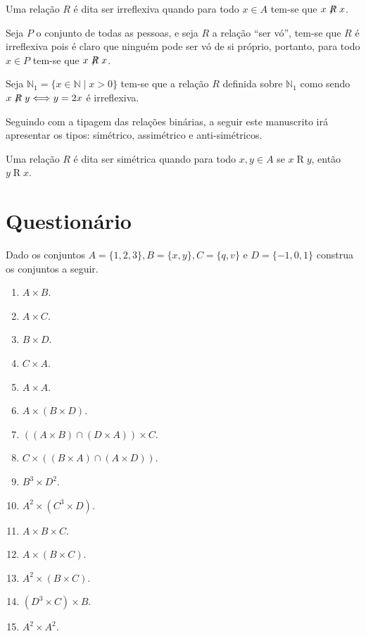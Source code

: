 \begin{definition}\label{def:RelacaoIrreflexiva}
	Uma relação $R$ é dita ser irreflexiva quando para todo $x \in A$ tem-se que $x \centernot{R} x$.
\end{definition}

\begin{exem}
	Seja $P$ o conjunto de todas as pessoas, e seja $R$ a relação ``ser vó'', tem-se que $R$ é irreflexiva pois é claro que ninguém pode ser vó de si próprio, portanto, para todo $x \in P$ tem-se que $x \centernot{R} x$.
\end{exem}

\begin{exem}
	Seja $\mathbb{N}_1 = \{x \in \mathbb{N} \mid x > 0\}$ tem-se que a relação $R$ definida sobre $\mathbb{N}_1$ como sendo $x \centernot{R} y \Longleftrightarrow y = 2x$ é irreflexiva.
\end{exem}

Seguindo com a tipagem das relações binárias,  a seguir este manuscrito irá apresentar os tipos: simétrico, assimétrico e anti-simétricos.

\begin{definition}\label{def:RelacaoSimétrica}
	Uma relação $R$ é dita ser simétrica quando para todo $x, y \in A$ se $x \mathrel{R} y$, então $y \mathrel{R} x$.
\end{definition}

\section{Questionário}

\begin{exercise}\label{exerc:Relcacoes1}
	Dado os conjuntos $A = \{1, 2, 3\}, B = \{x, y\}, C = \{q, v\}$ e $D = \{-1, 0, 1\}$ construa os conjuntos a seguir.
\end{exercise}

\begin{enumerate}
	\item $A \times B$.
	\item $A \times C$.
	\item $B \times D$.
	\item $C \times A$.
	\item $A \times A$.
	\item $A \times (B \times D)$.
	\item $((A \times B) \cap (D \times A)) \times C$.
	\item $C \times ((B \times A) \cap (A \times D))$.
	\item $B^3 \times D^2$.
	\item $A^2 \times (C^3 \times D)$.
	\item $A \times B \times C$.
	\item $A \times (B \times C)$.
	\item $A^2 \times (B \times C)$.
	\item $(D^3 \times C) \times B$.
	\item $A^2 \times A^2$.
\end{enumerate}

